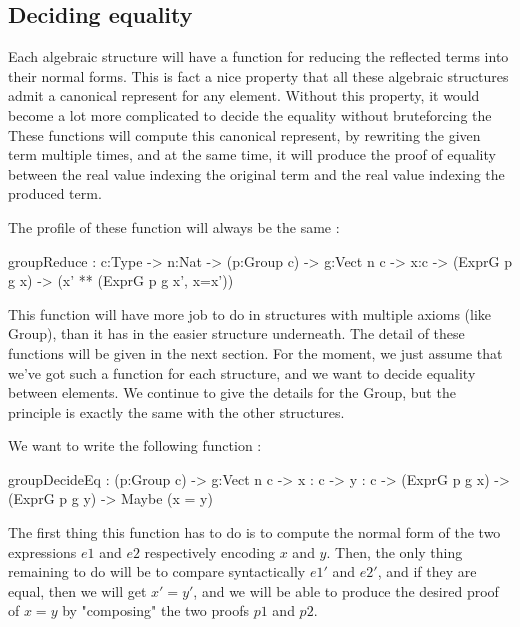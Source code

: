 \documentclass{sigplanconf}
\begin{document}
	\subsection {Deciding equality}
	
Each algebraic structure will have a function for reducing the reflected terms into their normal forms. This is fact a nice property that all these algebraic structures admit a canonical represent for any element. Without this property, it would become a lot more complicated to decide the equality without bruteforcing the 
These functions will compute this canonical represent, by rewriting the given term multiple times, and at the same time, it will produce the proof of equality between the real value indexing the original term and the real value indexing the produced term.

The profile of these function will always be the same :
\begin{code}[caption=Type of the reduction function for terms reflecting elements in a Group, captionpos=b, label=lst1:haskell2]
	groupReduce : {c:Type} -> {n:Nat} 
	  -> (p:Group c) -> {g:Vect n c} -> {x:c}
	  -> (ExprG p g x) 
	  -> (x' ** (ExprG p g x', x=x'))
\end{code}

This function will have more job to do in structures with multiple axioms (like Group), than it has in the easier structure underneath.
The detail of these functions will be given in the next section. For the moment, we just assume that we've got such a function for each structure, and we want to decide equality between elements. We continue to give the details for the Group, but the principle is exactly the same with the other structures.

We want to write the following function :
\begin{code}[caption=Type of the function for deciding equality between elements in a Group, captionpos=b, label=lst1:haskell2]
	groupDecideEq : (p:Group c) -> {g:Vect n c} 
	   -> {x : c} -> {y : c} 
	   -> (ExprG p g x) -> (ExprG p g y) 
	   -> Maybe (x = y)
\end{code}

The first thing this function has to do is to compute the normal form of the two expressions $e1$ and $e2$ respectively encoding $x$ and $y$.
Then, the only thing remaining to do will be to compare syntactically $e1'$ and $e2'$, and if they are equal, then we will get $x'=y'$, and we will be able to produce the desired proof of $x=y$ by "composing" the two proofs $p1$ and $p2$. 
\end{document}
